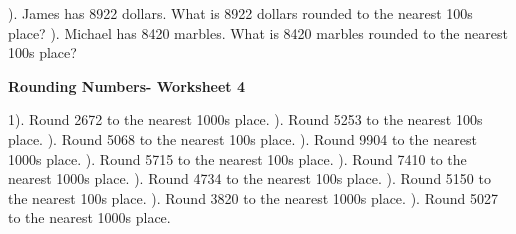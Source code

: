 \documentclass{article}%
\begin{document}
\newline%
\newline%
). James has 8922 dollars. What is 8922 dollars rounded to the nearest 100s place?%
\newline%
\newline%
). Michael has 8420 marbles. What is 8420 marbles rounded to the nearest 100s place?%
\newline%
\newline%
\newline%
\pagebreak%
\large%
\begin{center}%
\textbf{Rounding Numbers- Worksheet 4}%
\newline%
\end{center} \normalsize%
1). Round 2672 to the nearest 1000s place.%
\newline%
\newline%
). Round 5253 to the nearest 100s place.%
\newline%
\newline%
). Round 5068 to the nearest 100s place.%
\newline%
\newline%
). Round 9904 to the nearest 1000s place.%
\newline%
\newline%
). Round 5715 to the nearest 100s place.%
\newline%
\newline%
). Round 7410 to the nearest 1000s place.%
\newline%
\newline%
). Round 4734 to the nearest 100s place.%
\newline%
\newline%
). Round 5150 to the nearest 100s place.%
\newline%
\newline%
). Round 3820 to the nearest 1000s place.%
\newline%
\newline%
). Round 5027 to the nearest 1000s place.%
\end{document}
